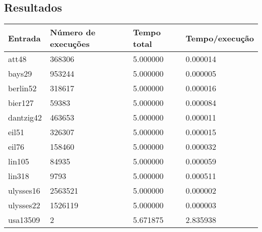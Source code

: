 \documentclass[12pt]{article}
\begin{document}
\subsection{ Resultados }
\begin{tabular}{llll}
  \toprule
  \textbf{Entrada}  &  \textbf{Número de execuções} &   \textbf{Tempo total} &  \textbf{Tempo/execução} \\
  \midrule
att48     & 368306 & 5.000000 & 0.000014 \\
bays29    & 953244 & 5.000000 & 0.000005 \\
berlin52  & 318617 & 5.000000 & 0.000016 \\
bier127   & 59383 & 5.000000 & 0.000084 \\
dantzig42 & 463653 & 5.000000 & 0.000011 \\
eil51     & 326307 & 5.000000 & 0.000015 \\
eil76     & 158460 & 5.000000 & 0.000032 \\
lin105    & 84935 & 5.000000 & 0.000059 \\
lin318    & 9793 & 5.000000 & 0.000511 \\
ulysses16 & 2563521 & 5.000000 & 0.000002 \\
ulysses22 & 1526119 & 5.000000 & 0.000003 \\
usa13509  & 2 & 5.671875 & 2.835938 \\
  \bottomrule 
\end{tabular}\\
\end{document}
